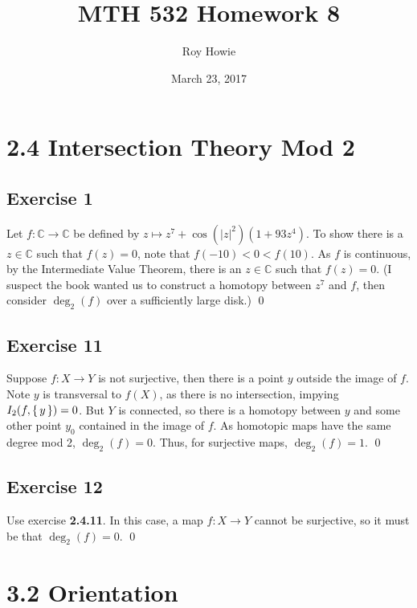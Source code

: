 \documentclass{article}
\newcommand{\C}{\mathbb{C}}
\begin{document}
\title{\vspace{-2cm}MTH 532 Homework 8}
\author{Roy Howie}
\date{March 23, 2017}
\maketitle

\section*{2.4 Intersection Theory Mod 2}
  \subsection*{Exercise 1}
    Let $f\colon\C\to\C$ be defined by $z\mapsto z^7+\cos(|z|^2)(1+93z^4)$. To
    show there is a $z\in\C$ such that $f(z)=0$, note that $f(-10)<0<f(10)$. As
    $f$ is continuous, by the Intermediate Value Theorem, there is an $z\in\C$
    such that $f(z)=0$. (I suspect the book wanted us to construct a homotopy
    between $z^7$ and $f$, then consider $\deg_2(f)$ over a sufficiently large
    disk.)
    \qed

  \subsection*{Exercise 11}
    Suppose $f\colon X\to Y$ is not surjective, then there is a point $y$
    outside the image of $f$. Note $y$ is transversal to $f(X)$, as there is no
    intersection, impying $I_2(f, \set{y})=0$. But $Y$ is connected, so there is
    a homotopy between $y$ and some other point $y_0$ contained in the image of
    $f$. As homotopic maps have the same degree mod 2, $\deg_2(f)=0$. Thus, for
    surjective maps, $\deg_2(f)=1$.
    \qed

  \subsection*{Exercise 12}
    Use exercise \textbf{2.4.11}. In this case, a map $f\colon X\to Y$ cannot be
    surjective, so it must be that $\deg_2(f)=0$.
    \qed

\section*{3.2 Orientation}
\end{document}
